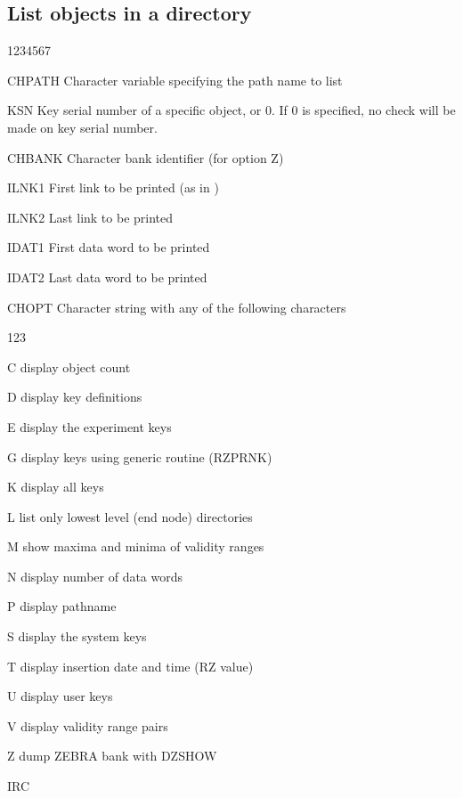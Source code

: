 \subsection{List objects in a directory}
\begin{DLtt}{1234567}
\item[CHPATH]Character variable specifying the path name to list
\item[KSN]Key serial number of a specific object, or 0.
If 0 is specified, no check will be made on key serial number.
\item[CHBANK]Character bank identifier (for option Z)
\item[ILNK1]First link to be printed (as in )
\item[ILNK2]Last link to be printed
\item[IDAT1]First data word to be printed
\item[IDAT2]Last data word to be printed
\item[CHOPT]Character string with any of the following characters
  \begin{DLtt}{123}
  \item[C]display object count
  \item[D]display key definitions
  \item[E]display the experiment keys
  \item[G]display keys using generic routine (RZPRNK)
  \item[K]display all keys
  \item[L]list only lowest level (end node) directories
  \item[M]show maxima and minima of validity ranges
  \item[N]display number of data words
  \item[P]display pathname
  \item[S]display the system keys
  \item[T]display insertion date and time (RZ value)
  \item[U]display user keys
  \item[V]display validity range pairs
  \item[Z]dump ZEBRA bank with DZSHOW
  \end{DLtt}
\item[IRC]
\end{DLtt}

